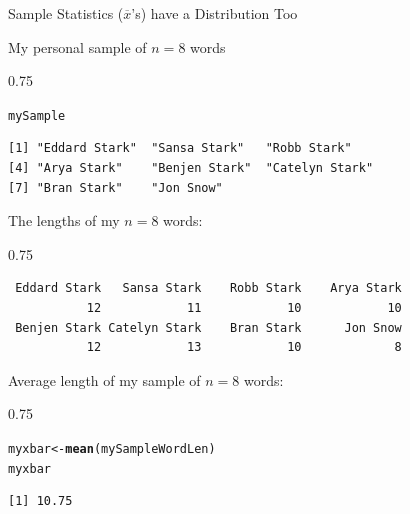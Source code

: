 \documentclass{beamer}\usepackage[]{graphicx}\usepackage[]{color}
\makeatletter
\newcommand{\hlstd}[1]{\textcolor[rgb]{0.102,0.102,0.102}{#1}}%
\newcommand{\hlkwb}[1]{\textcolor[rgb]{0.102,0.102,0.102}{#1}}%
\newcommand{\hlkwd}[1]{\textcolor[rgb]{0.102,0.102,0.102}{\textbf{#1}}}%
\newenvironment{kframe}{%
 \def\at@end@of@kframe{}%
 \ifinner\ifhmode%
  \def\at@end@of@kframe{\end{minipage}}%
  \begin{minipage}{\columnwidth}%
 \fi\fi%
 \def\FrameCommand##1{\hskip\@totalleftmargin \hskip-\fboxsep
 \colorbox{shadecolor}{##1}\hskip-\fboxsep
     \hskip-\linewidth \hskip-\@totalleftmargin \hskip\columnwidth}%
 \MakeFramed {\advance\hsize-\width
   \@totalleftmargin\z@ \linewidth\hsize
   \@setminipage}}%
 {\par\unskip\endMakeFramed%
 \at@end@of@kframe}
\newenvironment{knitrout}{}{} %
\renewenvironment{knitrout}{\begin{spacing}{0.75}\begin{tiny}}{\end{tiny}\end{spacing}}
\newcommand{\xbar}{\overline{x}}
\makeatother
\begin{document}
\begin{frame}{Sample Statistics ($\xbar$'s) have a Distribution Too\;\;}
\vskip0.25cm


My personal sample of $n=8$ words

\begin{knitrout}\small
{}\color{fgcolor}\begin{kframe}
\begin{alltt}
\hlstd{mySample}
\end{alltt}
\begin{verbatim}
[1] "Eddard Stark"  "Sansa Stark"   "Robb Stark"   
[4] "Arya Stark"    "Benjen Stark"  "Catelyn Stark"
[7] "Bran Stark"    "Jon Snow"     
\end{verbatim}
\end{kframe}
\end{knitrout}
The lengths of my $n=8$ words:
\begin{knitrout}\small
{}\color{fgcolor}\begin{kframe}
\begin{verbatim}
 Eddard Stark   Sansa Stark    Robb Stark    Arya Stark 
           12            11            10            10 
 Benjen Stark Catelyn Stark    Bran Stark      Jon Snow 
           12            13            10             8 
\end{verbatim}
\end{kframe}
\end{knitrout}
Average length of my sample of $n=8$ words:
\begin{knitrout}\small
{}\color{fgcolor}\begin{kframe}
\begin{alltt}
\hlstd{myxbar} \hlkwb{<-} \hlkwd{mean}\hlstd{(mySampleWordLen)}
\hlstd{myxbar}
\end{alltt}
\begin{verbatim}
[1] 10.75
\end{verbatim}
\end{kframe}
\end{knitrout}

\newpage


\end{frame}
\end{document}

